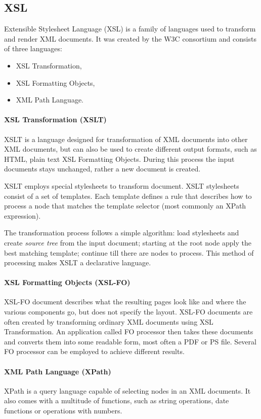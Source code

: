 \documentclass[11pt,oneside,final]{fithesis2}
\begin{document}
\subsection{XSL}
Extensible Stylesheet Language (XSL) is a family of languages used to transform and render XML documents. It was created by the W3C consortium and consists of three languages:
\begin{itemize}
\item XSL Transformation,
\item XSL Formatting Objects,
\item XML Path Language.
\end{itemize}

\paragraph*{XSL Transformation (XSLT)} 
XSLT is a language designed for transformation of XML documents into other XML documents, but can also be used to create different output formats, such as HTML, plain text XSL Formatting Objects. During this process the input documents stays unchanged, rather a new document is created. 

XSLT employs special stylesheets to transform document. XSLT stylesheets consist of a set of templates. Each template defines a rule that describes how to process a node that matches the template selector (most commonly an XPath expression). 

The transformation process follows a simple algorithm: load stylesheets and create \textit{source tree} from the input document; starting at the root node apply the best matching template; continue till there are nodes to process. This method of processing makes XSLT a declarative language.

\paragraph*{XSL Formatting Objects (XSL-FO)}
\label{xsl:xsl-fo}
XSL-FO document describes what the resulting pages look like and where the various components go, but does not specify the layout. XSL-FO documents are often created by transforming ordinary XML documents using XSL Transformation. An application called FO processor then takes these documents and converts them into some readable form, most often a PDF or PS file. Several FO processor can be employed to achieve different results.

\paragraph*{XML Path Language (XPath)}
\label{xsl:xpath}
XPath is a query language capable of selecting nodes in an XML documents. It also comes with a multitude of functions, such as string operations, date functions or operations with numbers. 
\end{document}

